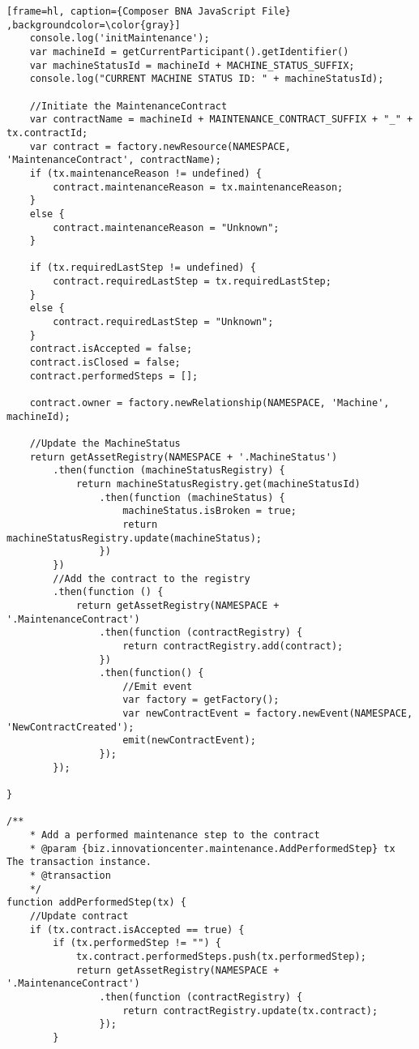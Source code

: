 \begin{appendices}
\begin{lstlisting}[frame=hl, caption={Composer BNA JavaScript File} ,backgroundcolor=\color{gray}]
    console.log('initMaintenance');
    var machineId = getCurrentParticipant().getIdentifier()
    var machineStatusId = machineId + MACHINE_STATUS_SUFFIX;
    console.log("CURRENT MACHINE STATUS ID: " + machineStatusId);

    //Initiate the MaintenanceContract
    var contractName = machineId + MAINTENANCE_CONTRACT_SUFFIX + "_" + tx.contractId;
    var contract = factory.newResource(NAMESPACE, 'MaintenanceContract', contractName);
    if (tx.maintenanceReason != undefined) {
        contract.maintenanceReason = tx.maintenanceReason;
    }
    else {
        contract.maintenanceReason = "Unknown";
    }

    if (tx.requiredLastStep != undefined) {
        contract.requiredLastStep = tx.requiredLastStep;
    }
    else {
        contract.requiredLastStep = "Unknown";
    }    
    contract.isAccepted = false;
    contract.isClosed = false;
    contract.performedSteps = [];
    
    contract.owner = factory.newRelationship(NAMESPACE, 'Machine', machineId);

    //Update the MachineStatus
    return getAssetRegistry(NAMESPACE + '.MachineStatus')
        .then(function (machineStatusRegistry) {
            return machineStatusRegistry.get(machineStatusId)
                .then(function (machineStatus) {
                    machineStatus.isBroken = true;
                    return machineStatusRegistry.update(machineStatus);
                })
        })
        //Add the contract to the registry
        .then(function () {
            return getAssetRegistry(NAMESPACE + '.MaintenanceContract')
                .then(function (contractRegistry) {
                    return contractRegistry.add(contract);
                })
                .then(function() {
                    //Emit event
                    var factory = getFactory();
                    var newContractEvent = factory.newEvent(NAMESPACE, 'NewContractCreated');
                    emit(newContractEvent);
                });
        });

}

/**
    * Add a performed maintenance step to the contract
    * @param {biz.innovationcenter.maintenance.AddPerformedStep} tx The transaction instance.
    * @transaction
    */
function addPerformedStep(tx) {
    //Update contract
    if (tx.contract.isAccepted == true) {
        if (tx.performedStep != "") {
            tx.contract.performedSteps.push(tx.performedStep);
            return getAssetRegistry(NAMESPACE + '.MaintenanceContract')
                .then(function (contractRegistry) {
                    return contractRegistry.update(tx.contract);
                });
        }


\end{lstlisting}
\end{appendices}
